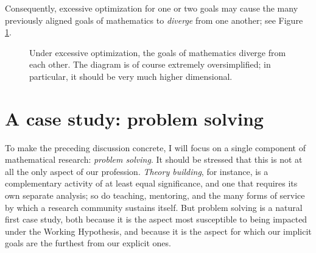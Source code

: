 \documentclass[12pt]{amsart}
\theoremstyle{definition}
\begin{document}
Consequently, excessive optimization for one or two goals may cause the many previously aligned goals of mathematics to \emph{diverge} from one another; see Figure \ref{diverge}.  

\begin{figure}[h]
\centering
{}
\caption{Under excessive optimization, the goals of mathematics diverge from each other.  The diagram is of course extremely oversimplified; in particular, it should be very much higher dimensional.}\label{diverge}
\end{figure}

\section{A case study: problem solving}

To make the preceding discussion concrete, I will focus on a single component of mathematical research: \emph{problem solving}.  It should be stressed that this is not at all the only aspect of our profession.  \emph{Theory building}, for instance, is a complementary activity of at least equal significance, and one that requires its own separate analysis; so do teaching, mentoring, and the many forms of service by which a research community sustains itself.  But problem solving is a natural first case study, both because it is the aspect most susceptible to being impacted under the Working Hypothesis, and because it is the aspect for which our implicit goals are the furthest from our explicit ones.
\end{document}
